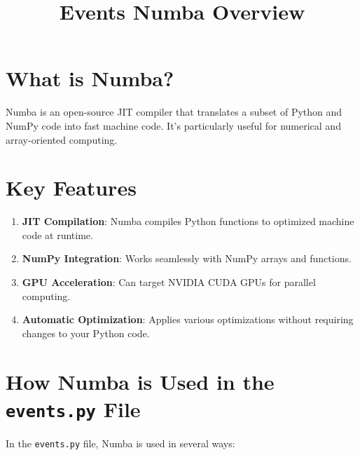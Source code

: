 \documentclass{article}
\title{Events Numba Overview}
\author{}
\date{}
\begin{document}
\maketitle

\section{What is Numba?}

Numba is an open-source JIT compiler that translates a subset of Python and NumPy code into fast machine code. It's particularly useful for numerical and array-oriented computing.

\section{Key Features}

\begin{enumerate}
    \item \textbf{JIT Compilation}: Numba compiles Python functions to optimized machine code at runtime.

    \item \textbf{NumPy Integration}: Works seamlessly with NumPy arrays and functions.

    \item \textbf{GPU Acceleration}: Can target NVIDIA CUDA GPUs for parallel computing.

    \item \textbf{Automatic Optimization}: Applies various optimizations without requiring changes to your Python code.
\end{enumerate}

\section{How Numba is Used in the \texttt{events.py} File}

In the \texttt{events.py} file, Numba is used in several ways:
\end{document}
